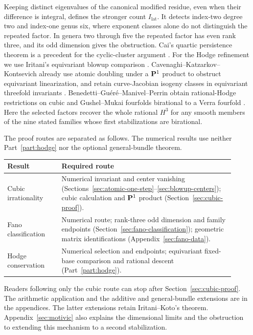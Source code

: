 Keeping distinct eigenvalues of the canonical modified residue, even when
their difference is integral, defines the stronger count $I_{\mathrm{lat}}$.
It detects index-two degree two and index-one genus six, where exponent
classes alone do not distinguish the repeated factor. In genera two through
five the repeated factor has even rank three, and its odd dimension gives
the obstruction. Cai's quartic persistence theorem is a precedent for the
cyclic-cluster argument \cite[Theorem~5.3]{CaiQuartic}.
For the Hodge refinement we use Iritani's equivariant blowup comparison
\cite{IritaniHodge}. Cavenaghi--Katzarkov--Kontsevich already use atomic
doubling under a $\mathbf P^1$ product to obstruct equivariant linearization,
and retain curve-Jacobian isogeny classes in equivariant threefold invariants
\cite[Theorems~E, F and H]{AtomsSymbols}. Benedetti--Gu\'er\'e--Manivel--Perrin
obtain rational-Hodge restrictions on cubic and Gushel--Mukai fourfolds
birational to a Verra fourfold \cite[Theorem~1]{VerraPartners}.
Here the selected factors recover the whole rational $H^3$ for any smooth
members of the nine stated families whose first stabilizations are birational.

The proof routes are separated as follows. The numerical results use
neither Part~\ref{part:hodge} nor the optional general-bundle theorem.
\begin{center}\small
\begin{tabular}{@{}p{0.22\linewidth}p{0.70\linewidth}@{}}
\toprule
Result & Required route\\\midrule
Cubic irrationality & Numerical invariant and center vanishing
(Sections~\ref{sec:atomic-one-step}--\ref{sec:blowup-centers});
cubic calculation and $\mathbf P^1$ product (Section~\ref{sec:cubic-proof}).\\
Fano classification & Numerical route; rank-three odd dimension and family
endpoints (Section~\ref{sec:fano-classification}); geometric matrix
identifications (Appendix~\ref{sec:fano-data}).\\
Hodge conservation & Numerical selection and endpoints; equivariant
fixed-base comparison and rational descent (Part~\ref{part:hodge}).\\
\bottomrule
\end{tabular}
\end{center}
Readers following only the cubic route can stop after
Section~\ref{sec:cubic-proof}. The arithmetic application and the
additive and general-bundle extensions are in the appendices.
The latter extensions retain Iritani--Koto's theorem.
Appendix~\ref{sec:motivic} also explains the dimensional limits and the
obstruction to extending this mechanism to a second stabilization.

